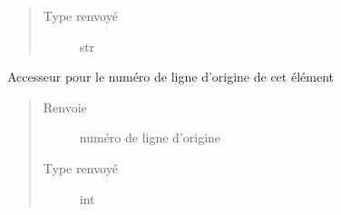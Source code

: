 \documentclass[letterpaper,10pt,french]{sphinxmanual}
\begin{document}
\begin{fulllineitems}
\begin{fulllineitems}
\begin{quote}
\begin{description}
\item[{Type renvoyé}] \leavevmode
str

\end{description}\end{quote}

\end{fulllineitems}


\begin{fulllineitems}
\label{\detokenize{structuresnodes:structuresnodes.StructureNode.lineNumber}}
Accesseur pour le numéro de ligne d’origine de cet élément
\begin{quote}\begin{description}
\item[{Renvoie}] \leavevmode
numéro de ligne d’origine

\item[{Type renvoyé}] \leavevmode
int

\end{description}\end{quote}

\end{fulllineitems}


\end{fulllineitems}

\end{document}
